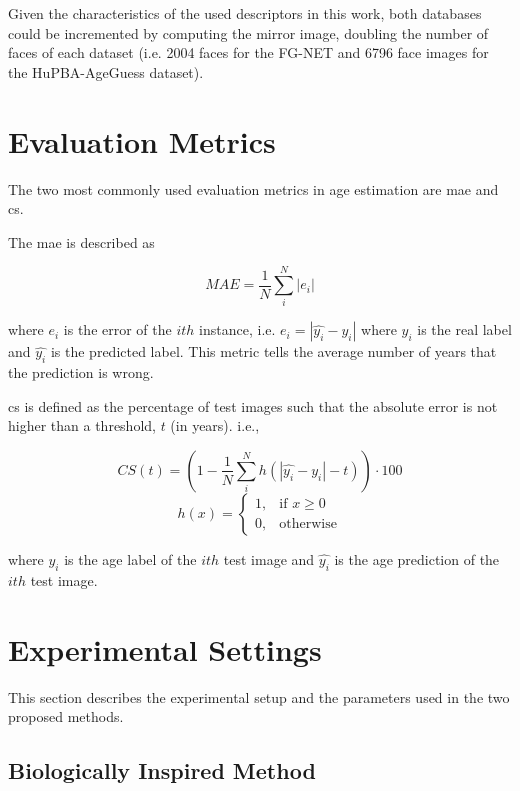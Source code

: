 Given the characteristics of the used descriptors in this work, both databases could be incremented by computing the mirror image, doubling the number of faces of each dataset (i.e. 2004 faces for the FG-NET and 6796 face images for the HuPBA-AgeGuess dataset).

\section{Evaluation Metrics} 

The two most commonly used evaluation metrics in age estimation are \acrfull{mae} and \gls{cs}.

The \gls{mae} is described as

\begin{equation}
MAE = \frac{1}{N}\sum_i^{N} |e_i|
\end{equation}

where $e_i$ is the error of the $ith$ instance, i.e. $e_i = |\hat{y_i} - y_i|$ where $y_i $ is the real label and $\hat{y_i}$ is the predicted label. This metric tells the average number of years that the prediction is wrong.

\gls{cs} is defined as the percentage of test images such that the absolute error is not higher than a threshold, $t$ (in years). i.e.,

\begin{equation}
CS(t) = (1 - \frac{1}{N}\sum_i^N h(|\hat{y_i} - y_i| - t))\cdot 100
\end{equation}
\begin{equation}
h(x) = 
\begin{cases}
1,				& \text{if } x \geq 0\\
0,              & \text{otherwise}
\end{cases}
\end{equation}

where $y_i$ is the age label of the $ith$ test image and $\hat{y_i}$ is the age prediction of the $ith$ test image.

\section{Experimental Settings}
This section describes the experimental setup and the parameters used in the two proposed methods.

\subsection{Biologically Inspired Method}

